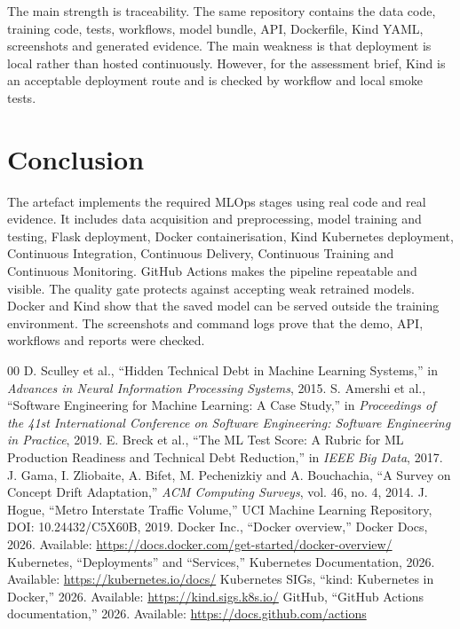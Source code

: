 \documentclass[journal,twoside,web]{ieeecolor}
\begin{document}
The main strength is traceability. The same repository contains the data code, training code, tests, workflows, model bundle, API, Dockerfile, Kind YAML, screenshots and generated evidence. The main weakness is that deployment is local rather than hosted continuously. However, for the assessment brief, Kind is an acceptable deployment route and is checked by workflow and local smoke tests.

\section{Conclusion}
The artefact implements the required MLOps stages using real code and real evidence. It includes data acquisition and preprocessing, model training and testing, Flask deployment, Docker containerisation, Kind Kubernetes deployment, Continuous Integration, Continuous Delivery, Continuous Training and Continuous Monitoring. GitHub Actions makes the pipeline repeatable and visible. The quality gate protects against accepting weak retrained models. Docker and Kind show that the saved model can be served outside the training environment. The screenshots and command logs prove that the demo, API, workflows and reports were checked.

\begin{thebibliography}{00}
 D. Sculley et al., ``Hidden Technical Debt in Machine Learning Systems,'' in \textit{Advances in Neural Information Processing Systems}, 2015.
 S. Amershi et al., ``Software Engineering for Machine Learning: A Case Study,'' in \textit{Proceedings of the 41st International Conference on Software Engineering: Software Engineering in Practice}, 2019.
 E. Breck et al., ``The ML Test Score: A Rubric for ML Production Readiness and Technical Debt Reduction,'' in \textit{IEEE Big Data}, 2017.
 J. Gama, I. Zliobaite, A. Bifet, M. Pechenizkiy and A. Bouchachia, ``A Survey on Concept Drift Adaptation,'' \textit{ACM Computing Surveys}, vol. 46, no. 4, 2014.
 J. Hogue, ``Metro Interstate Traffic Volume,'' UCI Machine Learning Repository, DOI: 10.24432/C5X60B, 2019.
 Docker Inc., ``Docker overview,'' Docker Docs, 2026. Available: \url{https://docs.docker.com/get-started/docker-overview/}
 Kubernetes, ``Deployments'' and ``Services,'' Kubernetes Documentation, 2026. Available: \url{https://kubernetes.io/docs/}
 Kubernetes SIGs, ``kind: Kubernetes in Docker,'' 2026. Available: \url{https://kind.sigs.k8s.io/}
 GitHub, ``GitHub Actions documentation,'' 2026. Available: \url{https://docs.github.com/actions}
\end{thebibliography}
\end{document}
